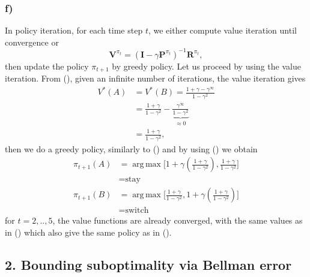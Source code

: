 \documentclass[12pt]{article}
\DeclareMathOperator*{\argmax}{arg\,max}
\begin{document}
\subsubsection*{f)}
In policy iteration, for each time step $t$, we either compute value iteration until convergence or
\begin{equation}
    \mathbf{V}^{\pi_t} = (\mathbf{I}-\gamma\mathbf{P}^{\pi_t})^{-1}\mathbf{R}^{\pi_t},
\end{equation}
then update the policy $\pi_{t+1}$ by greedy policy.
Let us proceed by using the value iteration. From (), given an infinite number of iterations, the value iteration gives
\begin{equation}
    \begin{split}
        V^*(A) &= V^*(B) =\frac{1 + \gamma -\gamma^\infty}{1-\gamma^2} \\
        &= \frac{1+\gamma}{1-\gamma^2} - \underbrace{\frac{\gamma^\infty}{1-\gamma^2}}_{\approx 0} \\
        &= \frac{1+\gamma}{1-\gamma^2},
    \end{split}
    \label{eq:valiterinfinite}
\end{equation}
then we do a greedy policy, similarly to () and by using () we obtain
\begin{equation}
    \begin{split}
        \pi_{t+1}(A) &= \argmax \Big[1+\gamma( \frac{1+\gamma}{1-\gamma^2}),  \frac{1+\gamma}{1-\gamma^2}\Big] \\
        &= \text{stay} \\
        \pi_{t+1}(B) &= \argmax \Big[\frac{1+\gamma}{1-\gamma^2}, 1+\gamma( \frac{1+\gamma}{1-\gamma^2})\Big] \\
        &= \text{switch}
    \end{split}
    \label{eq:policyiter}
\end{equation}
for $t=2,..,5$, the value functions are already converged, with the same values as in () which also give the same policy as in ().

\subsection*{2. Bounding suboptimality via Bellman error}
\end{document}
